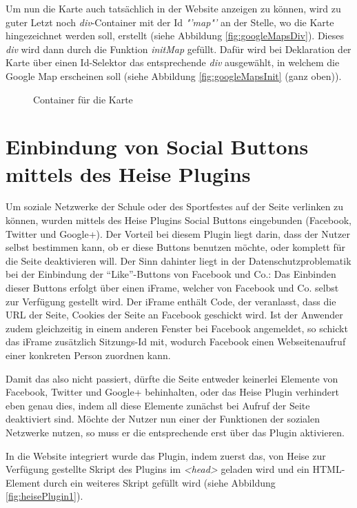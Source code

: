 Um nun die Karte auch tatsächlich in der Website anzeigen zu können, wird zu guter Letzt noch \textit{div}-Container mit der Id \textit{"'map"'} an der Stelle, wo die Karte hingezeichnet werden soll, erstellt (siehe Abbildung \vref{fig:googleMapsDiv}). Dieses \textit{div} wird dann durch die Funktion \textit{initMap} gefüllt. Dafür wird bei Deklaration der Karte über einen Id-Selektor das entsprechende \textit{div} ausgewählt, in welchem die Google Map erscheinen soll (siehe Abbildung \vref{fig:googleMapsInit} (ganz oben)).

\begin{figure}[!h]
	\caption{Container für die Karte}
	\label{fig:googleMapsDiv}
\end{figure}

\section{Einbindung von Social Buttons mittels des Heise Plugins}
\label{Einbindung von Social Buttons mittels des Heise Plugins}
Um soziale Netzwerke der Schule oder des Sportfestes auf der Seite verlinken zu können, wurden mittels des Heise Plugins Social Buttons eingebunden (Facebook, Twitter und Google+). Der Vorteil bei diesem Plugin liegt darin, dass der Nutzer selbst bestimmen kann, ob er diese Buttons benutzen möchte, oder komplett für die Seite deaktivieren will. Der Sinn dahinter liegt in der Datenschutzproblematik bei der Einbindung der "`Like"'-Buttons von Facebook und Co.: Das Einbinden dieser Buttons erfolgt über einen iFrame, welcher von Facebook und Co. selbst zur Verfügung gestellt wird. Der iFrame enthält Code, der veranlasst, dass die URL der Seite, Cookies der Seite an Facebook geschickt wird. Ist der Anwender zudem gleichzeitig in einem anderen Fenster bei Facebook angemeldet, so schickt das iFrame zusätzlich Sitzungs-Id mit, wodurch Facebook einen Webseitenaufruf einer konkreten Person zuordnen kann.
\par
Damit das also nicht passiert, dürfte die Seite entweder keinerlei Elemente von Facebook, Twitter und Google+ behinhalten, oder das Heise Plugin verhindert eben genau dies, indem all diese Elemente zunächst bei Aufruf der Seite deaktiviert sind. Möchte der Nutzer nun einer der Funktionen der sozialen Netzwerke nutzen, so muss er die entsprechende erst über das Plugin aktivieren.
\par
In die Website integriert wurde das Plugin, indem zuerst das, von Heise zur Verfügung gestellte Skript des Plugins im \textit{<head>} geladen wird und ein HTML-Element durch ein weiteres Skript gefüllt wird (siehe Abbildung \vref{fig:heisePlugin1}).

